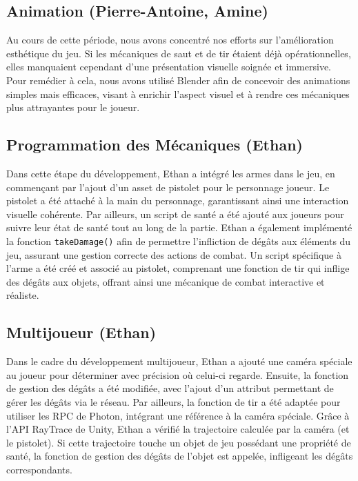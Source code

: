 \documentclass{report}
\begin{document}
\subsection*{Animation (Pierre-Antoine, Amine)}
Au cours de cette période, nous avons concentré nos efforts sur l’amélioration esthétique du jeu. Si les mécaniques de saut et de tir étaient déjà opérationnelles, elles manquaient cependant d’une présentation visuelle soignée et immersive. Pour remédier à cela, nous avons utilisé Blender afin de concevoir des animations simples mais efficaces, visant à enrichir l’aspect visuel et à rendre ces mécaniques plus attrayantes pour le joueur.

\subsection*{Programmation des Mécaniques (Ethan)}
Dans cette étape du développement, Ethan a intégré les armes dans le jeu, en commençant par l'ajout d'un asset de pistolet pour le personnage joueur. Le pistolet a été attaché à la main du personnage, garantissant ainsi une interaction visuelle cohérente. Par ailleurs, un script de santé a été ajouté aux joueurs pour suivre leur état de santé tout au long de la partie. Ethan a également implémenté la fonction \texttt{takeDamage()} afin de permettre l'infliction de dégâts aux éléments du jeu, assurant une gestion correcte des actions de combat. Un script spécifique à l’arme a été créé et associé au pistolet, comprenant une fonction de tir qui inflige des dégâts aux objets, offrant ainsi une mécanique de combat interactive et réaliste.

\subsection*{Multijoueur (Ethan)}
Dans le cadre du développement multijoueur, Ethan a ajouté une caméra spéciale au joueur pour déterminer avec précision où celui-ci regarde. Ensuite, la fonction de gestion des dégâts a été modifiée, avec l’ajout d’un attribut permettant de gérer les dégâts via le réseau. Par ailleurs, la fonction de tir a été adaptée pour utiliser les RPC de Photon, intégrant une référence à la caméra spéciale. Grâce à l'API RayTrace de Unity, Ethan a vérifié la trajectoire calculée par la caméra (et le pistolet). Si cette trajectoire touche un objet de jeu possédant une propriété de santé, la fonction de gestion des dégâts de l’objet est appelée, infligeant les dégâts correspondants.
\end{document}
